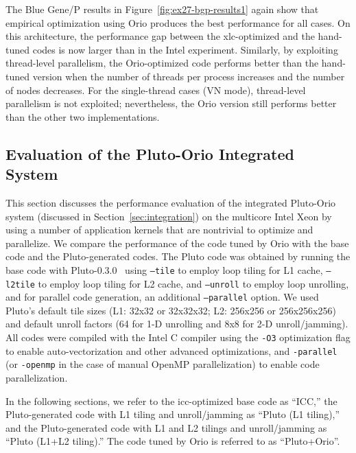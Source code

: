 The Blue Gene/P results in Figure~\ref{fig:ex27-bgp-results1} again
show that empirical optimization using Orio produces the best
performance for all cases. On this architecture, the performance gap
between the xlc-optimized and the hand-tuned codes is now larger than
in the Intel experiment. Similarly, by exploiting thread-level
parallelism, the Orio-optimized code performs better than the
hand-tuned version when the number of threads per process increases
and the number of nodes decreases. For the single-thread cases (VN
mode), thread-level parallelism is not exploited; nevertheless, the
Orio version still performs better than the other two implementations.


\subsection{Evaluation of the Pluto-Orio Integrated System} 

This section discusses the performance evaluation of the integrated
Pluto-Orio system (discussed in Section~\ref{sec:integration}) on the
multicore Intel Xeon by using a number of application kernels that are
nontrivial to optimize and parallelize. We compare the performance of the
code tuned by Orio with the base code and the Pluto-generated codes. The
Pluto code was obtained by running the base code with
Pluto-0.3.0~\cite{pluto030} using \texttt{--tile} to employ loop tiling for
L1 cache, \texttt{--l2tile} to employ loop tiling for L2 cache, and
\texttt{--unroll} to employ loop unrolling, and for parallel code generation,
an additional \texttt{--parallel} option. We used Pluto's default tile
sizes (L1: 32x32 or 32x32x32; L2: 256x256 or 256x256x256) and default
unroll factors (64 for 1-D unrolling and 8x8 for 2-D
unroll/jamming). All codes were compiled with the Intel C compiler
using the \texttt{-O3} optimization flag to enable auto-vectorization
and other advanced optimizations, and
\texttt{-parallel} (or \texttt{-openmp} in the case of manual OpenMP parallelization) 
to enable code parallelization.
 
In the following sections, we refer to the icc-optimized base code as
``ICC,'' the Pluto-generated code with L1 tiling and
unroll/jamming as ``Pluto (L1 tiling),'' and the Pluto-generated code with L1
and L2 tilings and unroll/jamming as ``Pluto (L1+L2 tiling).'' The code
tuned by Orio is referred to as ``Pluto+Orio''.

